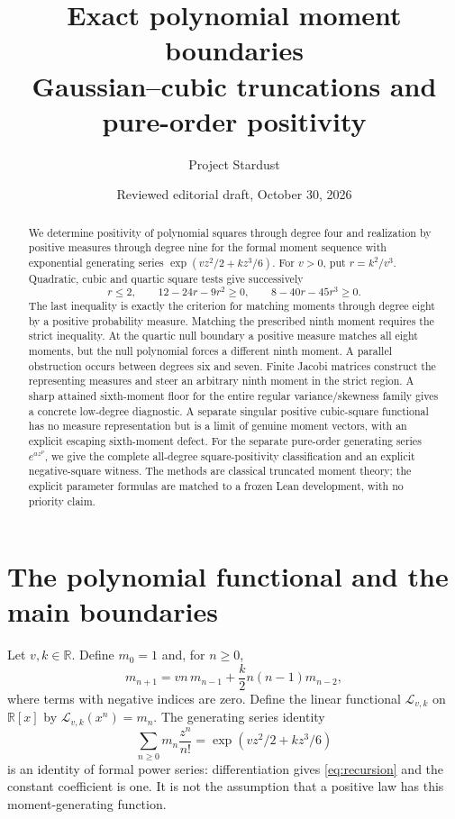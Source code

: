 \documentclass[11pt]{article}
\title{Exact polynomial moment boundaries\protect\\
Gaussian--cubic truncations and pure-order positivity}
\author{Project Stardust}
\date{Reviewed editorial draft, October 30, 2026}
\newcommand{\R}{\mathbb R}
\newcommand{\Lk}{\mathcal L_{v,k}}
\begin{document}
\maketitle
\begin{abstract}
We determine positivity of polynomial squares through degree four and
realization by positive measures through degree nine for the
formal moment sequence with exponential generating series
$\exp(vz^2/2+kz^3/6)$. For $v>0$, put $r=k^2/v^3$.
Quadratic, cubic and quartic square tests give successively
\[
 r\leq2,\qquad 12-24r-9r^2\geq0,\qquad
 8-40r-45r^3\geq0.
\]
The last inequality is exactly the
criterion for matching moments through degree eight by a
positive probability measure. Matching the prescribed ninth
moment requires the strict inequality. At the quartic null
boundary a positive measure matches all eight moments, but
the null polynomial forces a different ninth moment. A
parallel obstruction occurs between degrees six and seven.
Finite Jacobi matrices construct the representing measures
and steer an arbitrary ninth moment in the strict region.
A sharp attained sixth-moment floor for the entire regular variance/skewness family gives a concrete low-degree diagnostic. A separate singular positive cubic-square functional
has no measure representation but is a limit of genuine moment
vectors, with an explicit escaping sixth-moment defect.
For the separate pure-order generating series $e^{az^p}$, we give the complete all-degree square-positivity classification and an explicit negative-square witness. The methods are classical truncated moment
theory; the explicit parameter formulas are matched to a
frozen Lean development, with no priority claim.
\end{abstract}

\section{The polynomial functional and the main boundaries}
Let $v,k\in\R$. Define $m_0=1$ and, for $n\geq0$,
\begin{equation}\label{eq:recursion}
 m_{n+1}=vn\,m_{n-1}+\frac{k}{2}n(n-1)m_{n-2},
\end{equation}
where terms with negative indices are zero. Define the
linear functional $\Lk$ on $\R[x]$ by $\Lk(x^n)=m_n$.
The generating series identity
\begin{equation}\label{eq:formal}
 \sum_{n\geq0}m_n\frac{z^n}{n!}
       =\exp(vz^2/2+kz^3/6)
\end{equation}
is an identity of formal power series: differentiation
gives \eqref{eq:recursion} and the constant coefficient
is one. It is not the assumption that a positive law has
this moment-generating function.
\end{document}

